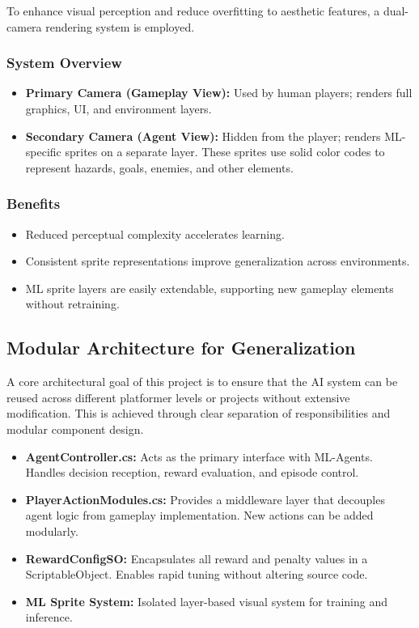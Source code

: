 \documentclass[12pt,oneside,openright,a4paper]{cpe-english-project}
\begin{document}
To enhance visual perception and reduce overfitting to aesthetic features, a dual-camera rendering system is employed.

\subsubsection{System Overview}

\begin{itemize}
\item \textbf{Primary Camera (Gameplay View):} Used by human players; renders full graphics, UI, and environment layers.
\item \textbf{Secondary Camera (Agent View):} Hidden from the player; renders ML-specific sprites on a separate layer. These sprites use solid color codes to represent hazards, goals, enemies, and other elements.
\end{itemize}

\subsubsection{Benefits}

\begin{itemize}
\item Reduced perceptual complexity accelerates learning.
\item Consistent sprite representations improve generalization across environments.
\item ML sprite layers are easily extendable, supporting new gameplay elements without retraining.
\end{itemize}

\subsection{Modular Architecture for Generalization}

A core architectural goal of this project is to ensure that the AI system can be reused across different platformer levels or projects without extensive modification. This is achieved through clear separation of responsibilities and modular component design.

\begin{itemize}
\item \textbf{AgentController.cs:} Acts as the primary interface with ML-Agents. Handles decision reception, reward evaluation, and episode control.
\item \textbf{PlayerActionModules.cs:} Provides a middleware layer that decouples agent logic from gameplay implementation. New actions can be added modularly.
\item \textbf{RewardConfigSO:} Encapsulates all reward and penalty values in a ScriptableObject. Enables rapid tuning without altering source code.
\item \textbf{ML Sprite System:} Isolated layer-based visual system for training and inference.
\end{itemize}
\end{document}
